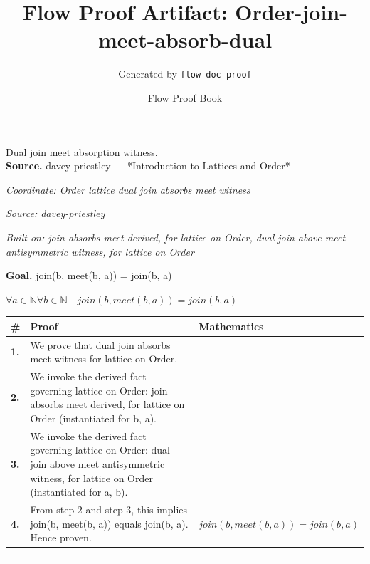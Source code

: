 \documentclass[11pt]{article}
\title{Flow Proof Artifact: Order-join-meet-absorb-dual}
\author{Generated by \texttt{flow doc proof}}
\date{Flow Proof Book}
\theoremstyle{definition}
\begin{document}
\maketitle
Dual join meet absorption witness.\\[0.5em]
\textbf{Source.} davey-priestley — *Introduction to Lattices and Order*\\[0.5em]
\bigskip
{}\par
\smallskip\noindent\textit{Coordinate: Order \cdot lattice \cdot dual join absorbs meet witness}\par
\smallskip\noindent\textit{Source: davey-priestley}\par
\smallskip\noindent\textit{Built on: join absorbs meet derived, for lattice on Order, dual join above meet antisymmetric witness, for lattice on Order}\par
\medskip
\noindent\textbf{Goal.} join(b, meet(b, a)) = join(b, a)\par
\noindent$\displaystyle \forall a \in \mathbb{N} \forall b \in \mathbb{N}\quad join(b, meet(b, a)) = join(b, a)$\par
\medskip
\noindent
\begin{tabular}{@{} >{\raggedright\arraybackslash}p{} >{\raggedright\arraybackslash}p{} >{\raggedleft\arraybackslash}p{} @{}}
\textbf{\#} & \textbf{Proof} & \textbf{Mathematics} \\
\midrule
\textbf{1.} & We prove that dual join absorbs meet witness for lattice on Order. & \\[0.45em]
\textbf{2.} & We invoke the derived fact governing lattice on Order: join absorbs meet derived, for lattice on Order (instantiated for b, a). & \\[0.45em]
\textbf{3.} & We invoke the derived fact governing lattice on Order: dual join above meet antisymmetric witness, for lattice on Order (instantiated for a, b). & \\[0.45em]
\textbf{4.} & From step 2 and step 3, this implies join(b, meet(b, a)) equals join(b, a). Hence proven. & $\displaystyle join(b, meet(b, a)) = join(b, a)$ \\[0.45em]
\bottomrule
\end{tabular}
\label{thm:Order-lattice-dual_join_absorbs_meet_witness}
\par\medskip\hrule
\end{document}
